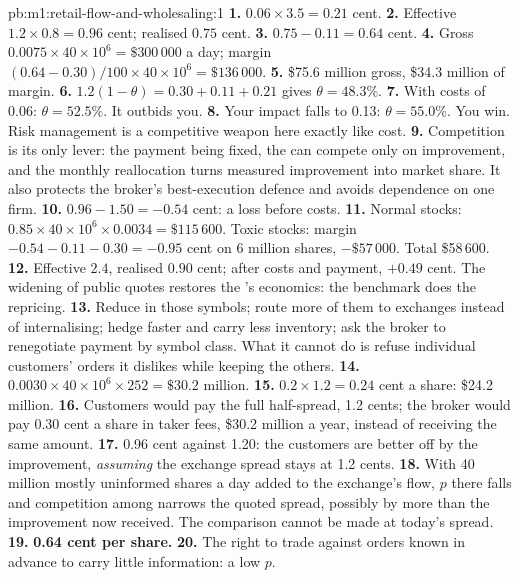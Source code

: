 \begin{solution}{pb:m1:retail-flow-and-wholesaling:1}
\textbf{1.} $0.06 \times 3.5 = 0.21$ cent.
\textbf{2.} Effective $1.2 \times 0.8 = 0.96$ cent; realised $0.75$ cent.
\textbf{3.} $0.75 - 0.11 = 0.64$ cent.
\textbf{4.} Gross $0.0075 \times 40\times10^6 = \$300\,000$ a day; margin
$(0.64 - 0.30)/100 \times 40\times10^6 = \$136\,000$.
\textbf{5.} \$75.6 million gross, \$34.3 million of margin.
\textbf{6.} $1.2(1-\theta) = 0.30 + 0.11 + 0.21$ gives $\theta = 48.3\%$.
\textbf{7.} With costs of 0.06: $\theta = 52.5\%$. It outbids you.
\textbf{8.} Your impact falls to 0.13: $\theta = 55.0\%$. You win. Risk
management is a competitive weapon here exactly like cost.
\textbf{9.} Competition is its only lever: the payment being fixed, the
 can compete only on improvement, and the monthly reallocation
turns measured improvement into market share. It also protects the broker's
best-execution defence and avoids dependence on one firm.
\textbf{10.} $0.96 - 1.50 = -0.54$ cent: a loss before costs.
\textbf{11.} Normal stocks: $0.85 \times 40\times10^6 \times 0.0034 =
\$115\,600$. Toxic stocks: margin $-0.54 - 0.11 - 0.30 = -0.95$ cent on 6
million shares, $-\$57\,000$. Total \$58\,600.
\textbf{12.} Effective $2.4$, realised $0.90$ cent; after costs and payment,
$+0.49$ cent. The widening of public quotes restores the 's
economics: the benchmark does the repricing.
\textbf{13.} Reduce  in those symbols; route more of them to
exchanges instead of internalising; hedge faster and carry less inventory;
ask the broker to renegotiate payment by symbol class. What it cannot do is
refuse individual customers' orders it dislikes while keeping the others.
\textbf{14.} $0.0030 \times 40\times10^6 \times 252 = \$30.2$ million.
\textbf{15.} $0.2 \times 1.2 = 0.24$ cent a share: \$24.2 million.
\textbf{16.} Customers would pay the full half-spread, 1.2 cents; the broker
would pay 0.30 cent a share in taker fees, \$30.2 million a year, instead of
receiving the same amount.
\textbf{17.} 0.96 cent against 1.20: the customers are better off by the
improvement, \emph{assuming} the exchange spread stays at 1.2 cents.
\textbf{18.} With 40 million mostly uninformed shares a day added to the
exchange's flow, $p$ there falls and competition among  narrows
the quoted spread, possibly by more than the improvement now received. The
comparison cannot be made at today's spread.
\textbf{19.} \textbf{0.64 cent per share.}
\textbf{20.} The right to trade against orders known in advance to carry
little information: a low $p$.
\end{solution}

